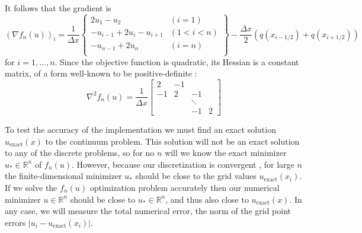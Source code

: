 \documentclass[11pt]{article}
\newcommand{\RR}{\mathbb{R}}
\newcommand{\grad}{\nabla}
\begin{document}
It follows that the gradient is
\begin{equation}
\left(\grad f_n(u)\right)_i = \frac{1}{\Delta x} \left\{\begin{matrix}
2 u_1 - u_2 & (i=1) \\
-u_{i-1} + 2 u_i - u_{i+1} & (1<i<n) \\
-u_{n-1} + 2 u_n & (i=n) \\
\end{matrix} \right\} - \frac{\Delta x}{2} (q(x_{i-1/2}) + q(x_{i+1/2}))
\end{equation}
for $i=1,\dots,n$.  Since the objective function is quadratic, its Hessian is a constant matrix, of a form well-known to be positive-definite \cite{LeVeque2007}:
\begin{equation}
\grad^2 f_n(u) = \frac{1}{\Delta x} \begin{bmatrix}
2  & -1 &    &    \\
-1 &  2 & -1 &    \\
   &    & \ddots &\\
   &    & -1 &  2
\end{bmatrix}
\end{equation}

\newcommand{\uex}{u_{\text{exact}}}
To test the accuracy of the implementation we must find an exact solution $\uex(x)$ to the continuum problem.  This solution will not be an exact solution to any of the discrete problems, so for no $n$ will we know the exact minimizer $u_* \in \RR^n$ of $f_n(u)$.  However, because our discretization is convergent \cite{Elmanetal2014,LeVeque2007}, for large $n$ the finite-dimensional minimizer $u_*$ should be close to the grid values $\uex(x_i)$.  If we solve the $f_n(u)$ optimization problem accurately then our numerical minimizer $u\in\RR^n$ should be close to $u_*\in\RR^n$, and thus also close to $\uex(x)$.  In any case, we will measure the total numerical error, the norm of the grid point errors $|u_i - \uex(x_i)|$.
\end{document}
